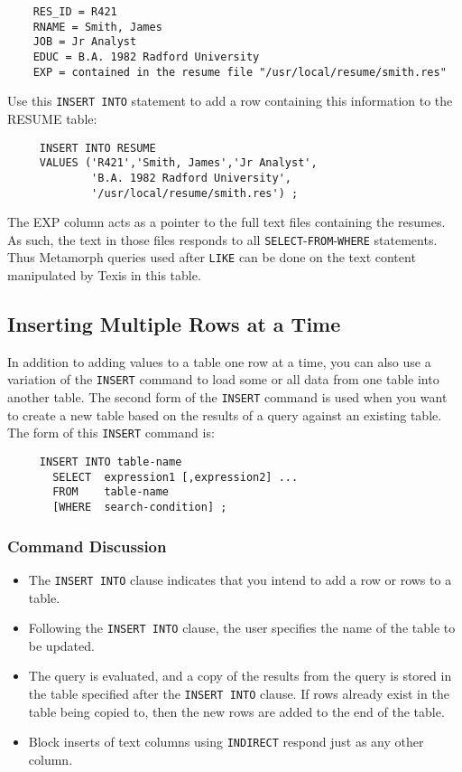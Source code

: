 \begin{verbatim}
    RES_ID = R421
    RNAME = Smith, James
    JOB = Jr Analyst
    EDUC = B.A. 1982 Radford University
    EXP = contained in the resume file "/usr/local/resume/smith.res"
\end{verbatim}

Use this {\tt INSERT INTO} statement to add a row containing this
information to the RESUME table:

\begin{verbatim}
     INSERT INTO RESUME
     VALUES ('R421','Smith, James','Jr Analyst',
             'B.A. 1982 Radford University',
             '/usr/local/resume/smith.res') ;
\end{verbatim}

The EXP column acts as a pointer to the full text files containing the
resumes.  As such, the text in those files responds to all
\verb`SELECT`-\verb`FROM`-\verb`WHERE` statements.  Thus Metamorph queries used after \verb`LIKE`
can be done on the text content manipulated by Texis in this table.

\subsection{Inserting Multiple Rows at a Time}

In addition to adding values to a table one row at a time, you can
also use a variation of the \verb`INSERT` command to load some or all data
from one table into another table.  The second form of the \verb`INSERT`
command is used when you want to create a new table based on the
results of a query against an existing table.  The form of this \verb`INSERT`
command is:
\begin{verbatim}
     INSERT INTO table-name
       SELECT  expression1 [,expression2] ...
       FROM    table-name
       [WHERE  search-condition] ;
\end{verbatim}

\subsubsection{Command Discussion}

\begin{itemize}
\item The {\tt INSERT INTO} clause indicates that you intend to add a row or
rows to a table.

\item Following the {\tt INSERT INTO} clause, the user specifies the name of
the table to be updated.

\item The query is evaluated, and a copy of the results from the query
is stored in the table specified after the {\tt INSERT INTO} clause.  If
rows already exist in the table being copied to, then the new rows are
added to the end of the table.

\item Block inserts of text columns using \verb`INDIRECT` respond just as any
other column.
\end{itemize}

